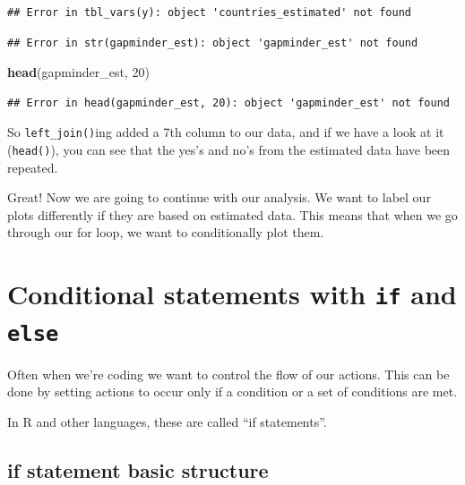 \documentclass[]{book}
\newenvironment{Shaded}{\begin{snugshade}}{\end{snugshade}}
\newcommand{\KeywordTok}[1]{\textcolor[rgb]{0.13,0.29,0.53}{\textbf{{#1}}}}
\newcommand{\DecValTok}[1]{\textcolor[rgb]{0.00,0.00,0.81}{{#1}}}
\newcommand{\CommentTok}[1]{\textcolor[rgb]{0.56,0.35,0.01}{\textit{{#1}}}}
\newcommand{\NormalTok}[1]{{#1}}
\theoremstyle{definition}
\theoremstyle{definition}
\theoremstyle{definition}
\theoremstyle{remark}
\begin{document}
\begin{verbatim}
## Error in tbl_vars(y): object 'countries_estimated' not found
\end{verbatim}

\begin{Shaded}
\end{Shaded}

\begin{verbatim}
## Error in str(gapminder_est): object 'gapminder_est' not found
\end{verbatim}

\begin{Shaded}
\begin{Highlighting}[]
\KeywordTok{head}\NormalTok{(gapminder_est, }\DecValTok{20}\NormalTok{)}
\end{Highlighting}
\end{Shaded}

\begin{verbatim}
## Error in head(gapminder_est, 20): object 'gapminder_est' not found
\end{verbatim}

So \texttt{left\_join()}ing added a 7th column to our data, and if we
have a look at it (\texttt{head()}), you can see that the yes's and no's
from the estimated data have been repeated.

Great! Now we are going to continue with our analysis. We want to label
our plots differently if they are based on estimated data. This means
that when we go through our for loop, we want to conditionally plot
them.

\section{\texorpdfstring{Conditional statements with \texttt{if} and
\texttt{else}}{Conditional statements with if and else}}\label{conditional-statements-with-if-and-else}

Often when we're coding we want to control the flow of our actions. This
can be done by setting actions to occur only if a condition or a set of
conditions are met.

In R and other languages, these are called ``if statements''.

\subsection{if statement basic
structure}\label{if-statement-basic-structure}
\end{document}

